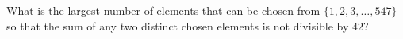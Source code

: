 What is the largest number of elements that can be chosen from $\{1,2,3,\dots,547\}$ so that the sum of any two distinct chosen elements is not divisible by $42$?

